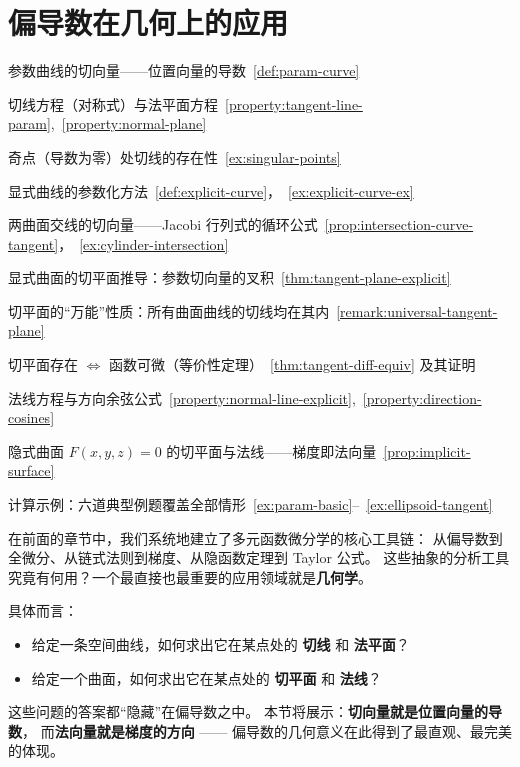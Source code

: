 \documentclass[lang=cn,11pt]{elegantbook}
\begin{document}
\section{偏导数在几何上的应用}

\begin{introduction}
  \item 参数曲线的切向量——位置向量的导数~\ref{def:param-curve}
  \item 切线方程（对称式）与法平面方程~\ref{property:tangent-line-param},~\ref{property:normal-plane}
  \item 奇点（导数为零）处切线的存在性~\ref{ex:singular-points}
  \item 显式曲线的参数化方法~\ref{def:explicit-curve}，~\ref{ex:explicit-curve-ex}
  \item 两曲面交线的切向量——Jacobi 行列式的循环公式~\ref{prop:intersection-curve-tangent}，~\ref{ex:cylinder-intersection}
  \item 显式曲面的切平面推导：参数切向量的叉积~\ref{thm:tangent-plane-explicit}
  \item 切平面的“万能”性质：所有曲面曲线的切线均在其内~\ref{remark:universal-tangent-plane}
  \item 切平面存在 $\Leftrightarrow$ 函数可微（等价性定理）~\ref{thm:tangent-diff-equiv} 及其证明
  \item 法线方程与方向余弦公式~\ref{property:normal-line-explicit},~\ref{property:direction-cosines}
  \item 隐式曲面 $F(x,y,z)=0$ 的切平面与法线——梯度即法向量~\ref{prop:implicit-surface}
  \item 计算示例：六道典型例题覆盖全部情形~\ref{ex:param-basic}--~\ref{ex:ellipsoid-tangent}
\end{introduction}

在前面的章节中，我们系统地建立了多元函数微分学的核心工具链：
从偏导数到全微分、从链式法则到梯度、从隐函数定理到 Taylor 公式。
这些抽象的分析工具究竟有何用？一个最直接也最重要的应用领域就是\textbf{几何学}。

具体而言：
\begin{itemize}
  \item 给定一条空间曲线，如何求出它在某点处的 \textbf{切线} 和 \textbf{法平面}？
  \item 给定一个曲面，如何求出它在某点处的 \textbf{切平面} 和 \textbf{法线}？
\end{itemize}

这些问题的答案都“隐藏”在偏导数之中。
本节将展示：\textbf{切向量就是位置向量的导数}，
而\textbf{法向量就是梯度的方向} —— 偏导数的几何意义在此得到了最直观、最完美的体现。
\end{document}

